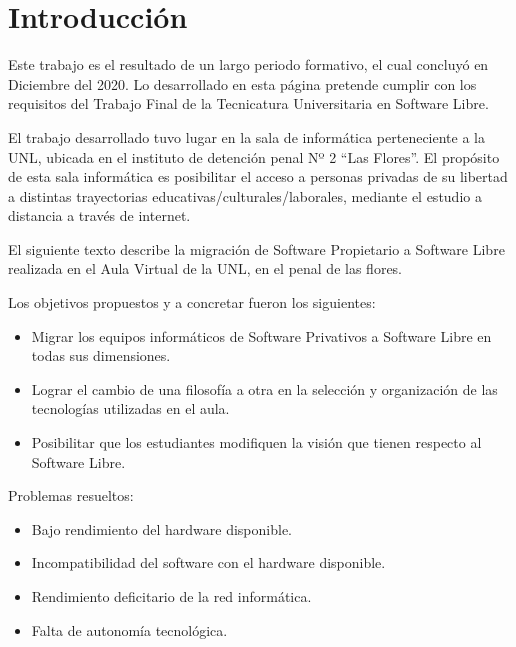 \chapter{Introducción}\label{ch:ntroducción}


	Este trabajo es el resultado de un largo periodo formativo, el cual 
	concluyó en Diciembre del 2020. Lo desarrollado en esta página pretende 
	cumplir con los requisitos del Trabajo Final de la Tecnicatura Universitaria 
	en Software Libre.\par
	
	El trabajo desarrollado tuvo lugar en la sala de informática perteneciente 
	a la UNL, ubicada en el instituto de detención penal Nº 2 “Las Flores”. 
	El propósito de esta sala informática es posibilitar el acceso a personas 
	privadas de su libertad a distintas trayectorias educativas/culturales/laborales, 
	mediante el estudio a distancia a través de internet.\par
	
	El siguiente texto describe la migración de Software Propietario a Software Libre 
	realizada en el Aula Virtual de la UNL, en el penal de las flores.\par
	
	Los objetivos propuestos y a concretar fueron los siguientes:\par
	
	\begin{itemize}
	
	    \item Migrar los equipos informáticos de Software Privativos 
	    a Software Libre en todas sus dimensiones.
	      
	    \item Lograr el cambio de una filosofía a otra en la selección y organización 
	    de las tecnologías utilizadas en el aula.
	      
	    \item Posibilitar que los estudiantes modifiquen la visión que tienen 
	    respecto al Software Libre.
	      
	\end{itemize}
	        
	     \vspace{0,5cm}
	
	     Problemas resueltos:
	
	\begin{itemize}
	            
	
	    \item Bajo rendimiento del hardware disponible.
	
	    
	    \item Incompatibilidad del software con el hardware disponible.
	
	    
	    \item Rendimiento deficitario de la red informática.
	
	    
	    \item Falta de autonomía tecnológica.
	
	    
	\end{itemize}
	        
